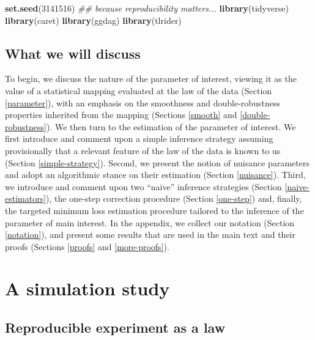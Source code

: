 \documentclass[11pt,openright,twoside]{book}
\newenvironment{Shaded}{\begin{snugshade}}{\end{snugshade}}
\newcommand{\CommentTok}[1]{\textcolor[rgb]{0.56,0.35,0.01}{\textit{#1}}}
\newcommand{\DecValTok}[1]{\textcolor[rgb]{0.00,0.00,0.81}{#1}}
\newcommand{\KeywordTok}[1]{\textcolor[rgb]{0.13,0.29,0.53}{\textbf{#1}}}
\newcommand{\NormalTok}[1]{#1}
\theoremstyle{definition}
\theoremstyle{definition}
\theoremstyle{definition}
\theoremstyle{remark}
\begin{document}
\begin{Shaded}
\begin{Highlighting}[]
\KeywordTok{set.seed}\NormalTok{(}\DecValTok{3141516}\NormalTok{) }\CommentTok{## because reproducibility matters...}
\KeywordTok{library}\NormalTok{(tidyverse)}
\KeywordTok{library}\NormalTok{(caret)}
\KeywordTok{library}\NormalTok{(ggdag)}
\KeywordTok{library}\NormalTok{(tlrider)}
\end{Highlighting}
\end{Shaded}

\hypertarget{discuss}{%
\subsection{What we will discuss}\label{discuss}}

To begin, we discuss the nature of the parameter of interest, viewing it as
the value of a statistical mapping evaluated at the law of the data (Section
\ref{parameter}), with an emphasis on the smoothness and double-robustness
properties inherited from the mapping (Sections \ref{smooth} and
\ref{double-robustness}). We then turn to the estimation of the parameter of
interest. We first introduce and comment upon a simple inference strategy
assuming provisionally that a relevant feature of the law of the data is known
to us (Section \ref{simple-strategy}). Second, we present the notion of
nuisance parameters and adopt an algorithmic stance on their estimation
(Section \ref{nuisance}). Third, we introduce and comment upon two ``naive''
inference strategies (Section \ref{naive-estimators}), the one-step
correction procedure (Section \ref{one-step}) and, finally, the targeted
minimum loss estimation procedure tailored to the inference of the parameter
of main interest. In the appendix, we collect our notation (Section
\ref{notation}), and present some results that are used in the main text and
their proofs (Sections \ref{proofs} and \ref{more-proofs}).

\hypertarget{simulation-study}{%
\section{A simulation study}\label{simulation-study}}

\hypertarget{reproducible-experiment}{%
\subsection{Reproducible experiment as a law}\label{reproducible-experiment}}
\end{document}
